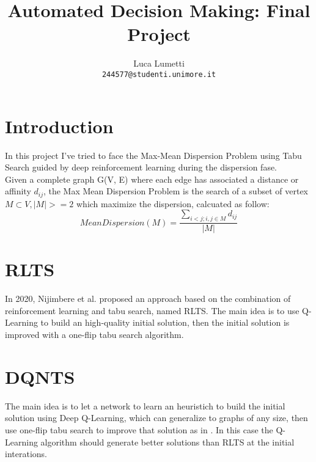 \documentclass{article}
\title{Automated Decision Making: Final Project}
\author{Luca Lumetti\\ \texttt{244577@studenti.unimore.it}}
\begin{document}
\maketitle

\section{Introduction}
In this project I've tried to face the Max-Mean Dispersion Problem using Tabu
Search guided by deep reinforcement learning during the dispersion fase.\\
Given a complete graph G(V, E) where each edge has associated a distance or
affinity $d_{ij}$, the Max Mean Dispersion Problem is the search of a subset of
vertex $M \subset V, |M| >= 2$ which maximize the dispersion, calcuated as
follow:
$$
MeanDispersion(M) = \frac{\sum_{i<j; i,j \in M}d_{ij}}{|M|}
$$
\section{RLTS}
In 2020, Nijimbere et al. proposed an approach based on the
combination of reinforcement learning and tabu search, named RLTS. The main idea is to use
Q-Learning to build an high-quality initial solution, then the
initial solution is improved with a one-flip tabu search algorithm.\\

\section{DQNTS}
The main idea is to let a network to learn an heuristich to build the initial
solution using Deep Q-Learning, which can generalize to graphs of any size, then use one-flip tabu
search to improve that solution as in \cite{nijimbere2020tabu}. In this case the
Q-Learning algorithm should generate better solutions than RLTS at the initial interations.
\end{document}
